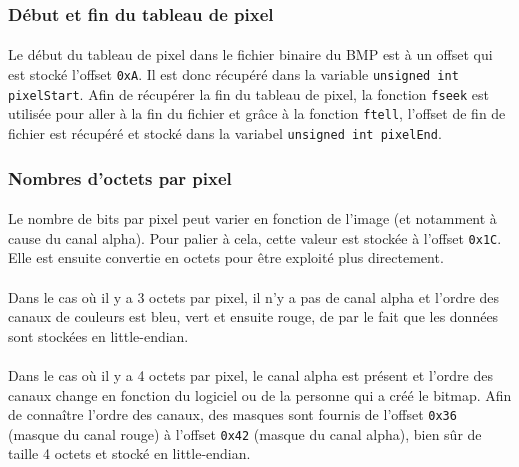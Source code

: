 \documentclass{report}
\begin{document}
\subsubsection{Début et fin du tableau de pixel}

\paragraph{} Le début du tableau de pixel dans le fichier binaire du BMP est à
un offset qui est stocké l'offset \texttt{0xA}. Il est donc récupéré dans la
variable \lstinline[style=prog]|unsigned int pixelStart|. Afin de récupérer la
fin du tableau de pixel, la fonction \lstinline[style=prog]|fseek| est utilisée
pour aller à la fin du fichier et grâce à la fonction
\lstinline[style=prog]|ftell|, l'offset de fin de fichier est récupéré et
stocké dans la variabel \lstinline[style=prog]|unsigned int pixelEnd|.

\subsubsection{Nombres d'octets par pixel}

\paragraph{} Le nombre de bits par pixel peut varier en fonction de l'image (et
notamment à cause du canal alpha). Pour palier à cela, cette valeur est stockée
à l'offset \texttt{0x1C}. Elle est ensuite convertie en octets pour être
exploité plus directement.

\paragraph{} Dans le cas où il y a 3 octets par pixel, il n'y a pas de canal
alpha et l'ordre des canaux de couleurs est bleu, vert et ensuite rouge, de par
le fait que les données sont stockées en little-endian.

\paragraph{} Dans le cas où il y a 4 octets par pixel, le canal alpha est
présent et l'ordre des canaux change en fonction du logiciel ou de la personne
qui a créé le bitmap. Afin de connaître l'ordre des canaux, des masques sont
fournis de l'offset \texttt{0x36} (masque du canal rouge) à l'offset
\texttt{0x42} (masque du canal alpha), bien sûr de taille 4 octets et stocké en
little-endian.
\end{document}
